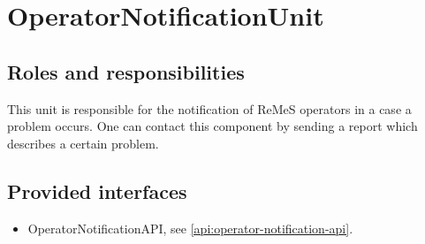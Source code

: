 \section{OperatorNotificationUnit}
\label{element:operator-notification-unit}

\subsection{Roles and responsibilities}

\npar This unit is responsible for the notification of ReMeS operators in a case
a problem occurs. One can contact this component by sending a report which
describes a certain problem.

\subsection{Provided interfaces}

\begin{itemize}
  \item OperatorNotificationAPI, see \ref{api:operator-notification-api}.
\end{itemize}



